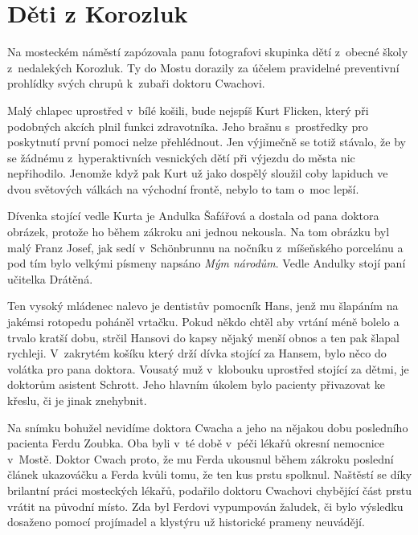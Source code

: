 
\chapter{Děti z Korozluk}

Na mosteckém náměstí zapózovala panu fotografovi skupinka dětí z~obecné školy
z~nedalekých Korozluk. Ty do Mostu dorazily za účelem pravidelné preventivní
prohlídky svých chrupů k~zubaři doktoru Cwachovi.

Malý chlapec uprostřed v~bílé košili, bude nejspíš Kurt Flicken, který při
podobných akcích plnil funkci zdravotníka. Jeho brašnu s~prostředky pro
poskytnutí první pomoci nelze přehlédnout. Jen výjimečně se totiž stávalo, že
by se žádnému z~hyperaktivních vesnických dětí při výjezdu do města nic
nepřihodilo. Jenomže když pak Kurt už jako dospělý sloužil coby lapiduch ve
dvou světových válkách na východní frontě, nebylo to tam o~moc lepší.

Dívenka stojící vedle Kurta je Andulka Šafářová a dostala od pana doktora
obrázek, protože ho během zákroku ani jednou nekousla. Na tom obrázku byl malý
Franz Josef, jak sedí v~Schönbrunnu na nočníku z~míšeňského porcelánu a pod tím
bylo velkými písmeny napsáno {\em Mým národům}. Vedle Andulky stojí
paní učitelka Drátěná.

Ten vysoký mládenec nalevo je dentistův pomocník Hans, jenž mu šlapáním na
jakémsi rotopedu poháněl vrtačku. Pokud někdo chtěl aby vrtání méně bolelo a
trvalo kratší dobu, strčil Hansovi do kapsy nějaký menší obnos a ten pak šlapal
rychleji. V~zakrytém košíku který drží dívka stojící za Hansem, bylo něco do
volátka pro pana doktora. Vousatý muž v~klobouku uprostřed stojící za dětmi, je
doktorům asistent Schrott. Jeho hlavním úkolem bylo pacienty přivazovat ke
křeslu, či je jinak znehybnit.

Na snímku bohužel nevidíme doktora Cwacha a jeho na nějakou dobu posledního
pacienta Ferdu Zoubka. Oba byli v~té době v~péči lékařů okresní nemocnice
v~Mostě. Doktor Cwach proto, že mu Ferda ukousnul během zákroku poslední článek
ukazováčku a Ferda kvůli tomu, že ten kus prstu spolknul. Naštěstí se díky
brilantní práci mosteckých lékařů, podařilo doktoru Cwachovi chybějící část
prstu vrátit na původní místo. Zda byl Ferdovi vypumpován žaludek, či bylo
výsledku dosaženo pomocí projímadel a klystýru už historické prameny neuvádějí.

